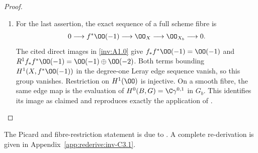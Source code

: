 \begin{proof}
\begin{enumerate}[label=\arabic*.,leftmargin=*]
\item For the last assertion, the exact sequence of a full scheme
fibre is
\[
 0\longrightarrow f^*\OO(-1)\longrightarrow\OO_X
   \longrightarrow\OO_{X_b}\longrightarrow0.
\]
The cited direct images in \ref{inv:A1.0} give
$f_*f^*\OO(-1)=\OO(-1)$ and
$R^1f_*f^*\OO(-1)=\OO(-1)\oplus\OO(-2)$.
Both terms bounding $H^1(X,f^*\OO(-1))$ in the degree-one Leray
edge sequence vanish, so this group vanishes. Restriction on
$H^1(\OO)$ is injective. On a smooth fibre, the same edge map is
the evaluation of $H^0(B,G)=\C\gamma^{0,1}$ in $G_b$.
This identifies its image as claimed and reproduces exactly
the application of \cite[Theorem~10.5(b), Step~4, p.~88]{AC2026}.
\end{enumerate}
\end{proof}



The Picard and fibre-restriction statement is due to \citet[Theorem~10.5]{AC2026}. A complete re-derivation is given in Appendix~\ref{app:rederive:inv-C3.1}.


